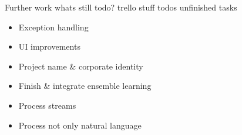 \begin{frame}{Further work}
	whats still todo?
	trello stuff todos
	unfinished tasks
	\begin{itemize}
		\item Exception handling
		\item UI improvements
		\item Project name \& corporate identity
		\item Finish \& integrate ensemble learning
		\item Process streams
		\item Process not only natural language
	\end{itemize}
\end{frame}